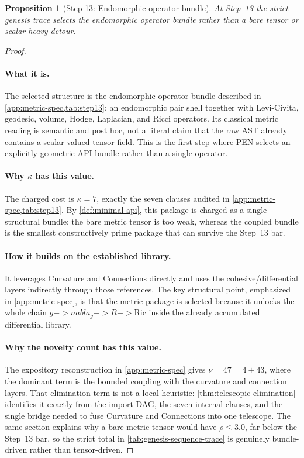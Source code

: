 \documentclass[11pt,a4paper]{article}
\def\to{->}%
\def\nabla{nabla}%
\theoremstyle{plain}
\newtheorem{proposition}[theorem]{Proposition}
\theoremstyle{definition}
\theoremstyle{remark}
\begin{document}
\begin{proposition}[Step 13: Endomorphic operator bundle]
\label{prop:genesis-step13}
At Step~13 the strict genesis trace selects the endomorphic operator bundle rather than a
bare tensor or scalar-heavy detour.
\end{proposition}

\begin{proof}
\paragraph{What it is.}
The selected structure is the endomorphic operator bundle described in
\cref{app:metric-spec,tab:step13}: an endomorphic pair shell together with
Levi-Civita, geodesic, volume, Hodge, Laplacian, and Ricci operators.
Its classical metric reading is semantic and post hoc, not a literal claim
that the raw AST already contains a scalar-valued tensor field.
This is the first step where PEN selects an explicitly geometric API bundle
rather than a single operator.

\paragraph{Why $\kappa$ has this value.}
The charged cost is $\kappa=7$, exactly the seven clauses audited in
\cref{app:metric-spec,tab:step13}.
By \cref{def:minimal-api}, this package is charged as a single structural bundle:
the bare metric tensor is too weak, whereas the coupled bundle is the smallest
constructively prime package that can survive the Step~13 bar.

\paragraph{How it builds on the established library.}
It leverages Curvature and Connections directly and uses the cohesive/differential
layers indirectly through those references.
The key structural point, emphasized in \cref{app:metric-spec}, is that the
metric package is selected because it unlocks the whole chain
$g\to\nabla_g\to R\to\mathrm{Ric}$ inside the already accumulated differential
library.

\paragraph{Why the novelty count has this value.}
The expository reconstruction in \cref{app:metric-spec} gives
$\nu=47=4+43$, where the dominant term is the bounded coupling with the
curvature and connection layers.
That elimination term is not a local heuristic: \cref{thm:telescopic-elimination}
identifies it exactly from the import DAG, the seven internal clauses, and the
single bridge needed to fuse Curvature and Connections into one telescope.
The same section explains why a bare metric tensor would have
$\rho\le 3.0$, far below the Step~13 bar, so the strict total in
\cref{tab:genesis-sequence-trace} is genuinely bundle-driven rather than
tensor-driven.


\end{proof}
\end{document}
